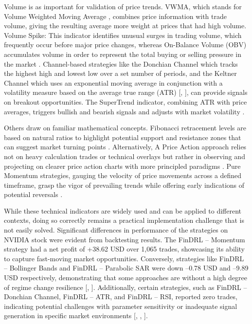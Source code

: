 Volume is as important for validation of price trends. VWMA, which stands for Volume Weighted Moving Average \cite{vwma_volume_2016}, combines price information with trade volume, giving the resulting average more weight at prices that had high volume. Volume Spike: This indicator identifies unusual surges in trading volume, which frequently occur before major price changes, whereas On-Balance Volume (OBV) accumulates volume in order to represent the total buying or selling pressure in the market \cite{obv_volume_1982}. Channel-based strategies like the Donchian Channel which tracks the highest high and lowest low over a set number of periods, and the Keltner Channel which uses an exponential moving average in conjunction with a volatility measure based on the average true range (ATR) [\cite{donchian_channel_2012}, \cite{keltner_channel_2005}], can provide signals on breakout opportunities. The SuperTrend indicator, combining ATR with price averages, triggers bullish and bearish signals and adjusts with market volatility \cite{supertrend_dynamic_2019}.

Others draw on familiar mathematical concepts. Fibonacci retracement levels are based on natural ratios to highlight potential support and resistance zones that can suggest market turning points \cite{fibonacci_retracement_2008}. Alternatively, A Price Action approach relies not on heavy calculation trades or technical overlays but rather in observing and projecting on clearer price action charts with more principled paradigms \cite{price_action_2017}. Pure Momentum strategies, gauging the velocity of price movements across a defined timeframe, grasp the vigor of prevailing trends while offering early indications of potential reversals \cite{macd_momentum_1986}.

While these technical indicators are widely used and can be applied to different contexts, doing so correctly remains a practical implementation challenge that is not easily solved. Significant differences in performance of the strategies on NVIDIA stock were evident from backtesting results. The FinDRL – Momentum strategy had a net profit of +38.62 USD over 1,065 trades, showcasing its ability to capture fast-moving market opportunities. Conversely, strategies like FinDRL – Bollinger Bands and FinDRL – Parabolic SAR were down –0.78 USD and –9.89 USD respectively, demonstrating that some approaches are without a high degree of regime change resilience [\cite{bollinger_bands_1991}, \cite{wilder_indicators_1978}]. Additionally, certain strategies, such as FinDRL – Donchian Channel, FinDRL – ATR, and FinDRL – RSI, reported zero trades, indicating potential challenges with parameter sensitivity or inadequate signal generation in specific market environments [\cite{donchian_channel_2012}, \cite{wilder_rsi_1978}, \cite{wilder_indicators_1978}].

